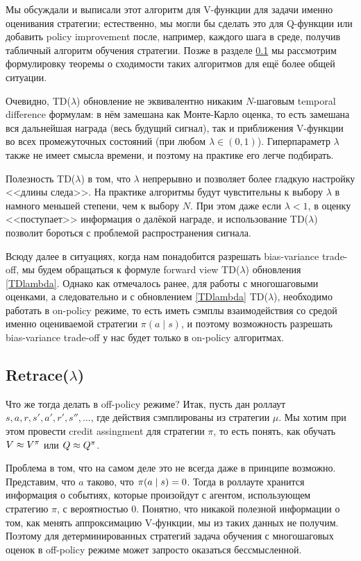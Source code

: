 Мы обсуждали и выписали этот алгоритм для V-функции для задачи именно оценивания стратегии; естественно, мы могли бы сделать это для Q-функции или добавить policy improvement после, например, каждого шага в среде, получив табличный алгоритм обучения стратегии. Позже в разделе \ref{subsec:retrace} мы рассмотрим формулировку теоремы о сходимости таких алгоритмов для ещё более общей ситуации.

Очевидно, TD($\lambda$) обновление не эквивалентно никаким $N$-шаговым temporal difference формулам: в нём замешана как Монте-Карло оценка, то есть замешана вся дальнейшая награда (весь будущий сигнал), так и приближения V-функции во всех промежуточных состояний (при любом $\lambda \in (0, 1)$). Гиперпараметр $\lambda$ также не имеет смысла времени, и поэтому на практике его легче подбирать.

\begin{remark}
Полезность TD($\lambda$) в том, что $\lambda$ непрерывно и позволяет более гладкую настройку <<длины следа>>. На практике алгоритмы будут чувстительны к выбору $\lambda$ в намного меньшей степени, чем к выбору $N$. При этом даже если $\lambda < 1$, в оценку <<поступает>> информация о далёкой награде, и использование TD($\lambda$) позволит бороться с проблемой распространения сигнала.
\end{remark}

Всюду далее в ситуациях, когда нам понадобится разрешать bias-variance trade-off, мы будем обращаться к формуле forward view TD($\lambda$) обновления \eqref{TDlambda}. Однако как отмечалось ранее, для работы с многошаговыми оценками, а следовательно и с обновлением \eqref{TDlambda} TD($\lambda$), необходимо работать в on-policy режиме, то есть иметь сэмплы взаимодействия со средой именно оцениваемой стратегии $\pi(a \mid s)$, и поэтому возможность разрешать bias-variance trade-off у нас будет только в on-policy алгоритмах.

\subsection{Retrace($\lambda$)}\label{subsec:retrace}

Что же тогда делать в off-policy режиме? Итак, пусть дан роллаут $s, a, r, s', a', r', s'', \dots$, где действия сэмплированы из стратегии $\mu$. Мы хотим при этом провести credit assingment для стратегии $\pi$, то есть понять, как обучать $V \HM\approx V^\pi$ или $Q \HM\approx Q^\pi$. 

Проблема в том, что на самом деле это не всегда даже в принципе возможно. Представим, что $a$ таково, что $\pi(a \HM\mid s) \HM= 0$. Тогда в роллауте хранится информация о событиях, которые произойдут с агентом, использующем стратегию $\pi$, с вероятностью 0. Понятно, что никакой полезной информации о том, как менять аппроксимацию V-функции, мы из таких данных не получим. Поэтому для детерминированных стратегий задача обучения с многошаговых оценок в off-policy режиме может запросто оказаться бессмысленной.

